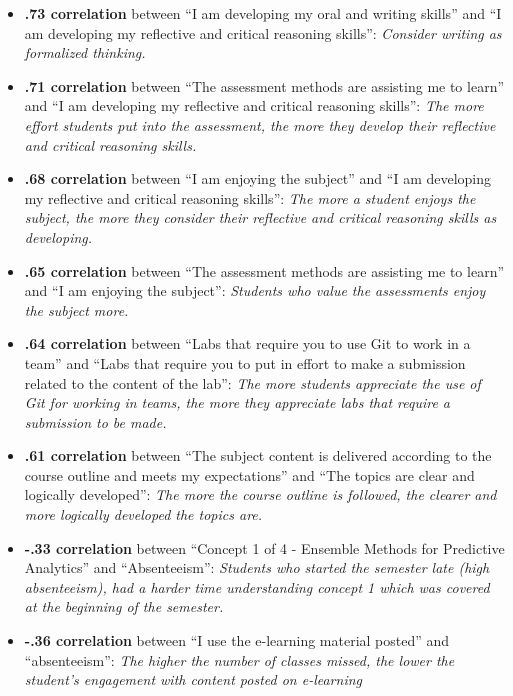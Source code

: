 \documentclass[
]{article}
\begin{document}
\begin{itemize}
\item
  \textbf{.73 correlation} between ``I am developing my oral and writing
  skills'' and ``I am developing my reflective and critical reasoning
  skills'': \emph{Consider writing as formalized thinking.}
\item
  \textbf{.71 correlation} between ``The assessment methods are
  assisting me to learn'' and ``I am developing my reflective and
  critical reasoning skills'': \emph{The more effort students put into
  the assessment, the more they develop their reflective and critical
  reasoning skills.}
\item
  \textbf{.68 correlation} between ``I am enjoying the subject'' and ``I
  am developing my reflective and critical reasoning skills'': \emph{The
  more a student enjoys the subject, the more they consider their
  reflective and critical reasoning skills as developing.}
\item
  \textbf{.65 correlation} between ``The assessment methods are
  assisting me to learn'' and ``I am enjoying the subject'':
  \emph{Students who value the assessments enjoy the subject more.}
\item
  \textbf{.64 correlation} between ``Labs that require you to use Git to
  work in a team'' and ``Labs that require you to put in effort to make
  a submission related to the content of the lab'': \emph{The more
  students appreciate the use of Git for working in teams, the more they
  appreciate labs that require a submission to be made.}
\item
  \textbf{.61 correlation} between ``The subject content is delivered
  according to the course outline and meets my expectations'' and ``The
  topics are clear and logically developed'': \emph{The more the course
  outline is followed, the clearer and more logically developed the
  topics are.}
\item
  \textbf{-.33 correlation} between ``Concept 1 of 4 - Ensemble Methods
  for Predictive Analytics'' and ``Absenteeism'': \emph{Students who
  started the semester late (high absenteeism), had a harder time
  understanding concept 1 which was covered at the beginning of the
  semester.}
\item
  \textbf{-.36 correlation} between ``I use the e-learning material
  posted'' and ``absenteeism'': \emph{The higher the number of classes
  missed, the lower the student's engagement with content posted on
  e-learning}
\end{itemize}
\end{document}
